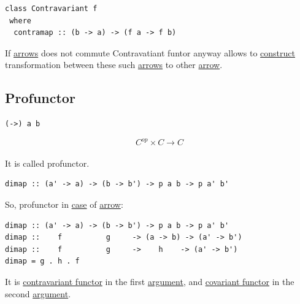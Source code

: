 \documentclass[11pt]{article}
\begin{document}
\begin{verbatim}
class Contravariant f
 where
  contramap :: (b -> a) -> (f a -> f b)
\end{verbatim}


If \hyperref[org33f3f3f]{arrows} does not commute Contravatiant funtor anyway allows to \hyperref[orgc1046f9]{construct} transformation between these such \hyperref[org33f3f3f]{arrows} to other \hyperref[org5b6e6e9]{arrow}.\\

\subsection{Profunctor}
\label{sec:orga0c80ca}

\begin{verbatim}
(->) a b
\end{verbatim}

$$ C^{op} \times C \to C $$\\

It is called profunctor.\\

\begin{verbatim}
dimap :: (a' -> a) -> (b -> b') -> p a b -> p a' b'
\end{verbatim}

So, profunctor in \hyperref[org96bceb0]{case} of \hyperref[org5b6e6e9]{arrow}:\\


\begin{verbatim}
dimap :: (a' -> a) -> (b -> b') -> p a b -> p a' b'
dimap ::    f          g     -> (a -> b) -> (a' -> b') 
dimap ::    f          g     ->    h    -> (a' -> b')
dimap = g . h . f
\end{verbatim}

It is \hyperref[org4f18281]{contravariant functor} in the first \hyperref[orgf66a5f7]{argument}, and \hyperref[orgdf09291]{covariant functor} in the second \hyperref[orgf66a5f7]{argument}.\\
\end{document}
